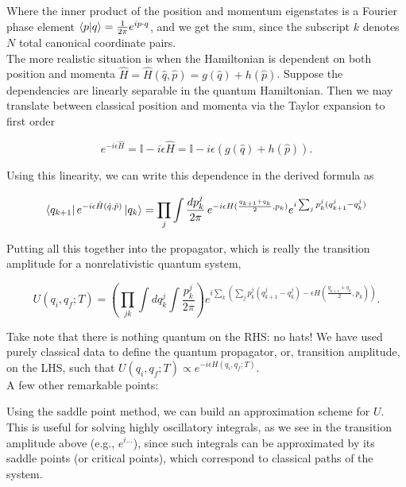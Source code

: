 \noindent Where the inner product of the position and momentum eigenstates is a Fourier phase element $\braket{p | q} = \frac{1}{2\pi} e^{i p \cdot q}$, and we get the sum, since the subscript $k$ denotes $N$ total canonical coordinate pairs. \\

\noindent The more realistic situation is when the Hamiltonian is dependent on both position and momenta $\hat{H} = \hat{H}(\hat{q}, \hat{p}) = g(\hat{q}) + h(\hat{p})$. Suppose the dependencies are linearly separable in the quantum Hamiltonian. Then we may translate between classical position and momenta via the Taylor expansion to first order

\begin{equation}
e^{-i \epsilon \hat{H}} = \mathbb{I} - i \epsilon \hat{H} = \mathbb{I} - i \epsilon (g(\hat{q}) + h(\hat{p})).
\end{equation}

\noindent Using this linearity, we can write this dependence in the derived formula as

\begin{equation}
\bra{q_{k+1}} e^{-i \epsilon \hat{H}(\hat{q}, \hat{p})} \ket{q_k} = \prod_j \int \frac{dp_k^j}{2\pi} \, e^{ -i \epsilon H (\frac{q_{k+1}+q_k}{2}, p_k)} e^{ i \sum_j p_k^j (q_{k+1}^j - q_k^j ) }
\end{equation}

\noindent Putting all this together into the propagator, which is really the transition amplitude for a nonrelativistic quantum system,

\begin{equation}
U(q_i, q_f; T) = \left(  \prod_{jk} \int dq_k^j \int \frac{p_k^j}{2\pi} \right) e^{i \sum_k \left( \sum_j p_k^j (q_{k+1}^j - q_k^j) - \epsilon H (\frac{q_{k+1} + q_k}{2}, p_k) \right)}.
\end{equation}

\noindent Take note that there is nothing quantum on the RHS: no hats! We have used purely classical data to define the quantum propagator, or, transition amplitude, on the LHS, such that $U(q_i, q_f; T) \propto e^{- i \epsilon H (q_i, q_f; T)}$. \\

\noindent A few other remarkable points:

\noindent Using the saddle point method, we can build an approximation scheme for $U$. This is useful for solving highly oscillatory integrals, as we see in the transition amplitude above (e.g., $e^{i\dots}$), since such integrals can be approximated by its saddle points (or critical points), which correspond to classical paths of the system. \\

